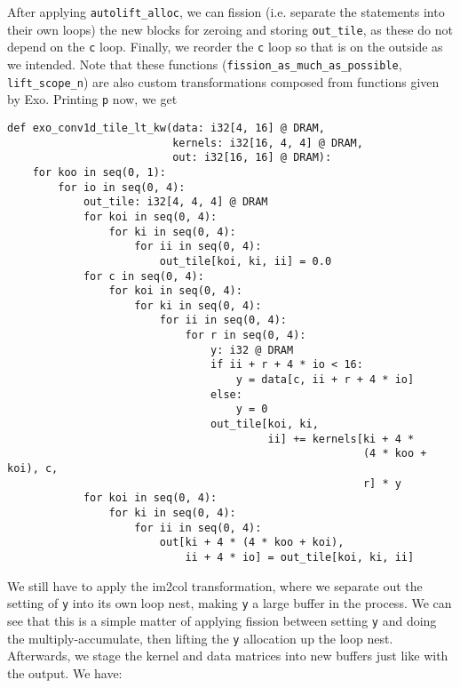 \documentclass[acmsmall, nonacm=true]{acmart}
\begin{document}
After applying \verb|autolift_alloc|, we can fission (i.e. separate the statements into their own loops) the new blocks for zeroing and storing \verb|out_tile|, as these do not depend on the \verb|c| loop. Finally, we reorder the \verb|c| loop so that is on the outside as we intended. Note that these functions (\verb|fission_as_much_as_possible|, \verb|lift_scope_n|)  are also custom transformations composed from functions given by Exo. Printing \verb|p| now, we get
\begin{verbatim}
def exo_conv1d_tile_lt_kw(data: i32[4, 16] @ DRAM,
                          kernels: i32[16, 4, 4] @ DRAM,
                          out: i32[16, 16] @ DRAM):
    for koo in seq(0, 1):
        for io in seq(0, 4):
            out_tile: i32[4, 4, 4] @ DRAM
            for koi in seq(0, 4):
                for ki in seq(0, 4):
                    for ii in seq(0, 4):
                        out_tile[koi, ki, ii] = 0.0
            for c in seq(0, 4):
                for koi in seq(0, 4):
                    for ki in seq(0, 4):
                        for ii in seq(0, 4):
                            for r in seq(0, 4):
                                y: i32 @ DRAM
                                if ii + r + 4 * io < 16:
                                    y = data[c, ii + r + 4 * io]
                                else:
                                    y = 0
                                out_tile[koi, ki,
                                         ii] += kernels[ki + 4 *
                                                        (4 * koo + koi), c,
                                                        r] * y
            for koi in seq(0, 4):
                for ki in seq(0, 4):
                    for ii in seq(0, 4):
                        out[ki + 4 * (4 * koo + koi),
                            ii + 4 * io] = out_tile[koi, ki, ii]
\end{verbatim}

We still have to apply the im2col transformation, where we separate out the setting of \verb|y| into its own loop nest, making \verb|y| a large buffer in the process. We can see that this is a simple matter of applying fission between setting \verb|y| and doing the multiply-accumulate, then lifting the \verb|y| allocation up the loop nest. Afterwards, we stage the kernel and data matrices into new buffers just like with the output. We have:
\end{document}
